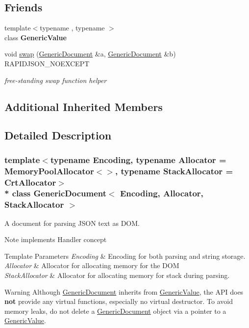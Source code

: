 \subsection*{Friends}
\begin{DoxyCompactItemize}
\item 
{\footnotesize template$<$typename , typename $>$ }\\class {\bfseries Generic\+Value}\hypertarget{a00115_a899449e1a645b5e377af059fb61113d8}{}\label{a00115_a899449e1a645b5e377af059fb61113d8}

\item 
void \hyperlink{a00115_a0d63efcc43758ac3aed77e868233369d}{swap} (\hyperlink{a00115}{Generic\+Document} \&a, \hyperlink{a00115}{Generic\+Document} \&b) R\+A\+P\+I\+D\+J\+S\+O\+N\+\_\+\+N\+O\+E\+X\+C\+E\+PT
\begin{DoxyCompactList}\small\item\em free-\/standing swap function helper \end{DoxyCompactList}\end{DoxyCompactItemize}
\subsection*{Additional Inherited Members}


\subsection{Detailed Description}
\subsubsection*{template$<$typename Encoding, typename Allocator = Memory\+Pool\+Allocator$<$$>$, typename Stack\+Allocator = Crt\+Allocator$>$\\*
class Generic\+Document$<$ Encoding, Allocator, Stack\+Allocator $>$}

A document for parsing J\+S\+ON text as D\+OM. 

\begin{DoxyNote}{Note}
implements Handler concept 
\end{DoxyNote}

\begin{DoxyTemplParams}{Template Parameters}
{\em Encoding} & Encoding for both parsing and string storage. \\
\hline
{\em Allocator} & Allocator for allocating memory for the D\+OM \\
\hline
{\em Stack\+Allocator} & Allocator for allocating memory for stack during parsing. \\
\hline
\end{DoxyTemplParams}
\begin{DoxyWarning}{Warning}
Although \hyperlink{a00115}{Generic\+Document} inherits from \hyperlink{a00130}{Generic\+Value}, the A\+PI does {\bfseries not} provide any virtual functions, especially no virtual destructor. To avoid memory leaks, do not {\ttfamily delete} a \hyperlink{a00115}{Generic\+Document} object via a pointer to a \hyperlink{a00130}{Generic\+Value}. 
\end{DoxyWarning}


